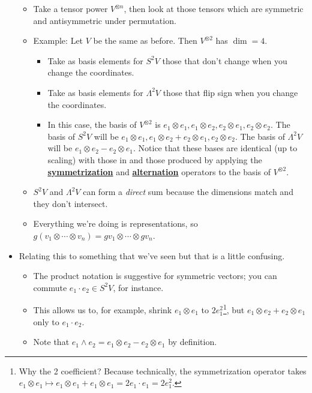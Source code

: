 \documentclass[../notes.tex]{subfiles}
\begin{document}
\begin{itemize}
\begin{itemize}
        \item Take a tensor power $V^{\otimes n}$, then look at those tensors which are symmetric and antisymmetric under permutation.
        \item Example: Let $V$ be the same as before. Then $V^{\otimes 2}$ has $\dim=4$.
        \begin{itemize}
            \item Take as basis elements for $S^2V$ those that don't change when you change the coordinates.
            \item Take as basis elements for $\Lambda^2V$ those that flip sign when you change the coordinates.
            \item In this case, the basis of $V^{\otimes 2}$ is $e_1\otimes e_1,e_1\otimes e_2,e_2\otimes e_1,e_2\otimes e_2$. The basis of $S^2V$ will be $e_1\otimes e_1,e_1\otimes e_2+e_2\otimes e_1,e_2\otimes e_2$. The basis of $\Lambda^2V$ will be $e_1\otimes e_2-e_2\otimes e_1$. Notice that these bases are identical (up to scaling) with those in \textcite{bib:Serre} and those produced by applying the \href{https://en.wikipedia.org/wiki/Symmetrization}{\textbf{symmetrization}} and \href{https://en.wikipedia.org/wiki/Exterior_algebra#Alternating_tensor_algebra}{\textbf{alternation}} operators to the basis of $V^{\otimes 2}$.
        \end{itemize}
        \item $S^2V$ and $\Lambda^2V$ can form a \emph{direct} sum because the dimensions match and they don't intersect.
        \item Everything we're doing is representations, so $g(v_1\otimes\cdots\otimes v_n)=gv_1\otimes\cdots\otimes gv_n$.
    \end{itemize}
    \item Relating this to something that we've seen but that is a little confusing.
    \begin{itemize}
        \item The product notation is suggestive for symmetric vectors; you can commute $e_1\cdot e_2\in S^2V$, for instance.
        \item This allows us to, for example, shrink $e_1\otimes e_1$ to $2e_1^2$\footnote{Why the 2 coefficient? Because technically, the symmetrization operator takes $e_1\otimes e_1\mapsto e_1\otimes e_1+e_1\otimes e_1=2e_1\cdot e_1=2e_1^2$.}, but $e_1\otimes e_2+e_2\otimes e_1$ only to $e_1\cdot e_2$.
        \item Note that $e_1\wedge e_2=e_1\otimes e_2-e_2\otimes e_1$ by definition.

\end{itemize}
\end{itemize}
\end{document}
